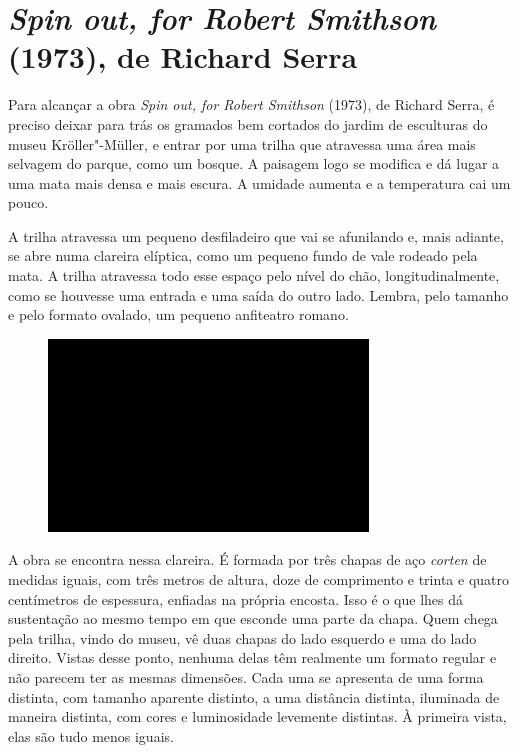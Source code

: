 \chapter{\emph{Spin out, for Robert Smithson} (1973), de Richard Serra}

Para alcançar a obra \emph{Spin out, for Robert Smithson} (1973), de
Richard Serra, é preciso deixar para trás os gramados bem cortados do
jardim de esculturas do museu Kröller"-Müller, e entrar por uma trilha
que atravessa uma área mais selvagem do parque, como um bosque. A
paisagem logo se modifica e dá lugar a uma mata mais densa e mais
escura. A umidade aumenta e a temperatura cai um pouco.

A trilha atravessa um pequeno desfiladeiro que vai se afunilando e, mais
adiante, se abre numa clareira elíptica, como um pequeno fundo de vale
rodeado pela mata. A trilha atravessa todo esse espaço pelo nível do
chão, longitudinalmente, como se houvesse uma entrada e uma saída do
outro lado. Lembra, pelo tamanho e pelo formato ovalado, um pequeno
anfiteatro romano.

\begin{figure}[!ht]
\centering
 \includegraphics[width=85mm]{./imgs/im1.jpg}
\caption{\tiny{}}
\end{figure}

A obra se encontra nessa clareira. É formada por três chapas de aço
\emph{corten} de medidas iguais, com três metros de altura, doze de
comprimento e trinta e quatro centímetros de espessura, enfiadas na
própria encosta. Isso é o que lhes dá sustentação ao mesmo tempo em que
esconde uma parte da chapa. Quem chega pela trilha, vindo do museu, vê
duas chapas do lado esquerdo e uma do lado direito. Vistas desse ponto,
nenhuma delas têm realmente um formato regular e não parecem ter as
mesmas dimensões. Cada uma se apresenta de uma forma distinta, com
tamanho aparente distinto, a uma distância distinta, iluminada de
maneira distinta, com cores e luminosidade levemente distintas. À
primeira vista, elas são tudo menos iguais.


